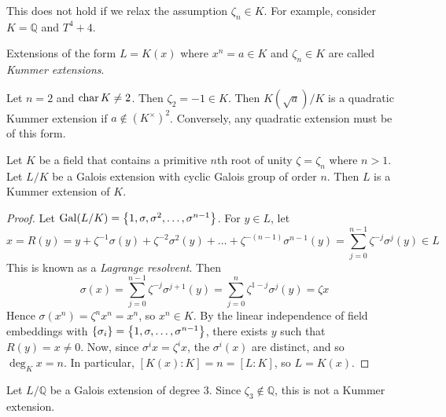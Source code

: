 \begin{remark}
	This does not hold if we relax the assumption \( \zeta_n \in K \).
	For example, consider \( K = \mathbb Q \) and \( T^4 + 4 \).
\end{remark}
\begin{definition}
	Extensions of the form \( L = K(x) \) where \( x^n = a \in K \) and \( \zeta_n \in K \) are called \emph{Kummer extensions}.
\end{definition}
\begin{example}
	Let \( n = 2 \) and \( \operatorname{char} K \neq 2 \).
	Then \( \zeta_2 = -1 \in K \).
	Then \( K(\sqrt a) / K \) is a quadratic Kummer extension if \( a \not\in (K^\times)^2 \).
	Conversely, any quadratic extension must be of this form.
\end{example}
\begin{theorem}
	Let \( K \) be a field that contains a primitive \( n \)th root of unity \( \zeta = \zeta_n \) where \( n > 1 \).
	Let \( L / K \) be a Galois extension with cyclic Galois group of order \( n \).
	Then \( L \) is a Kummer extension of \( K \).
\end{theorem}
\begin{proof}
	Let \( \operatorname{Gal}(L/K) = \qty{1, \sigma, \sigma^2, \dots, \sigma^{n-1}} \).
	For \( y \in L \), let
	\[ x = R(y) = y + \zeta^{-1} \sigma(y) + \zeta^{-2}\sigma^2(y) + \dots + \zeta^{-(n-1)} \sigma^{n-1}(y) = \sum_{j=0}^{n-1} \zeta^{-j} \sigma^j(y) \in L \]
	This is known as a \emph{Lagrange resolvent}.
	Then
	\[ \sigma(x) = \sum_{j=0}^{n-1} \zeta^{-j} \sigma^{j+1}(y) = \sum_{j=0}^n \zeta^{1-j} \sigma^j(y) = \zeta x \]
	Hence \( \sigma(x^n) = \zeta^n x^n = x^n \), so \( x^n \in K \).
	By the linear independence of field embeddings with \( \qty{\sigma_i} = \qty{1, \sigma, \dots, \sigma^{n-1}} \), there exists \( y \) such that \( R(y) = x \neq 0 \).
	Now, since \( \sigma^i x = \zeta^i x \), the \( \sigma^i(x) \) are distinct, and so \( \deg_K x = n \).
	In particular, \( [K(x) : K] = n = [L : K] \), so \( L = K(x) \).
\end{proof}
\begin{example}
	Let \( L / \mathbb Q \) be a Galois extension of degree 3.
	Since \( \zeta_3 \not\in \mathbb Q \), this is not a Kummer extension.
\end{example}
